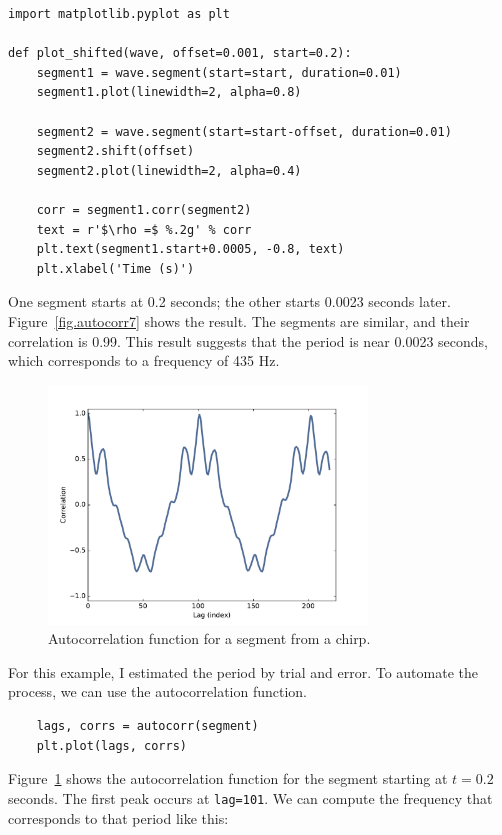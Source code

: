 \documentclass[12pt]{book}
\begin{document}
\begin{verbatim}
import matplotlib.pyplot as plt

def plot_shifted(wave, offset=0.001, start=0.2):
    segment1 = wave.segment(start=start, duration=0.01)
    segment1.plot(linewidth=2, alpha=0.8)

    segment2 = wave.segment(start=start-offset, duration=0.01)
    segment2.shift(offset)
    segment2.plot(linewidth=2, alpha=0.4)

    corr = segment1.corr(segment2)
    text = r'$\rho =$ %.2g' % corr
    plt.text(segment1.start+0.0005, -0.8, text)
    plt.xlabel('Time (s)')
\end{verbatim}

One segment starts at 0.2 seconds; the other starts 0.0023 seconds
later.  Figure~\ref{fig.autocorr7} shows the result.  The segments
are similar, and their correlation is 0.99.  This result suggests
that the period is near 0.0023 seconds, which corresponds to a frequency
of 435 Hz.

\begin{figure}
\centerline{\includegraphics[height=2.5in]{figs/autocorr8.pdf}}
\caption{Autocorrelation function for a segment from a chirp.}
\label{fig.autocorr8}
\end{figure}

For this example, I estimated the period by trial and error.  To automate
the process, we can use the autocorrelation function.

\begin{verbatim}
    lags, corrs = autocorr(segment)
    plt.plot(lags, corrs)
\end{verbatim}

Figure~\ref{fig.autocorr8} shows the autocorrelation function for
the segment starting at $t=0.2$ seconds.  The first peak occurs at
{\tt lag=101}.  We can compute the frequency that corresponds
to that period like this:
\end{document}
